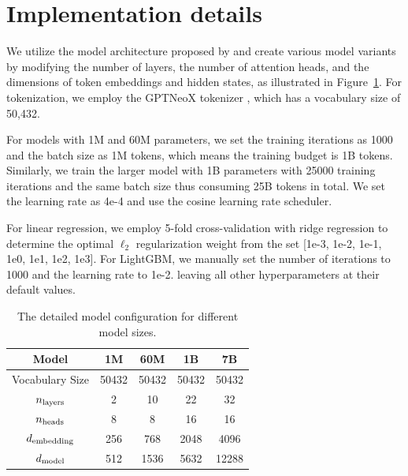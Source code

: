 \section{Implementation details}
\label{appendix:implement}
We utilize the model architecture proposed by \citet{zhang2024tinyllama} and create various model variants by modifying the number of layers, the number of attention heads, and the dimensions of token embeddings and hidden states, as illustrated in Figure~\ref{tab:model_config}.
For tokenization, we employ the GPTNeoX tokenizer \citep{black2022gpt}, which has a vocabulary size of 50,432.

For models with 1M and 60M parameters, we set the training iterations as 1000 and the batch size as 1M tokens, which means the training budget is 1B tokens.
Similarly, we train the larger model with 1B parameters with 25000 training iterations and the same batch size thus consuming 25B tokens in total.
We set the learning rate as 4e-4 and use the cosine learning rate scheduler.

For linear regression, we employ 5-fold cross-validation with ridge regression to determine the optimal $\ell_2$ regularization weight from the set [1e-3, 1e-2, 1e-1, 1e0, 1e1, 1e2, 1e3].
For LightGBM, we manually set the number of iterations to 1000 and the learning rate to 1e-2.
leaving all other hyperparameters at their default values.



\begin{table}[htbp]
    \centering
    \caption{The detailed model configuration for different model sizes.}
    \label{tab:model_config}
    \begin{tabular}{ccccc}
        \toprule
        \textbf{Model} & \textbf{1M} & \textbf{60M} & \textbf{1B} & \textbf{7B}\\
        \midrule
        Vocabulary Size & 50432 & 50432 & 50432 & 50432 \\
        $n_{\rm layers}$ & 2 & 10 & 22 & 32\\
        $n_{\rm heads}$ & 8 & 8 & 16 & 16 \\
        $d_{\rm embedding}$ & 256 & 768 & 2048 & 4096 \\
        $d_{\rm model}$ & 512 & 1536 & 5632 & 12288 \\
        \bottomrule
    \end{tabular}
\end{table}
